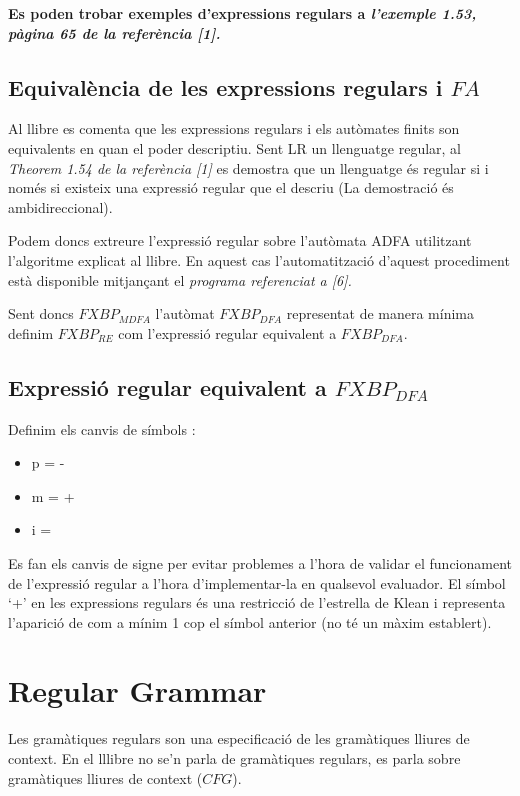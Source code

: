 \documentclass[12pt,a4paper]{report}
\def \dfa{$FXBP_{DFA} $}
\def \mfa{$FXBP_{MDFA} $}
\def \re{$FXBP_{RE} $}
\def \cfg{$CFG$}
\begin{document}
\textbf{Es poden trobar exemples d’expressions regulars a \textit{l’exemple 1.53, pàgina 65 de la referència [1].}}

\subsection{Equivalència de les expressions regulars i $FA$}

Al llibre es comenta que les expressions regulars i els autòmates finits son equivalents en quan el poder descriptiu. Sent LR un llenguatge regular, al \textit{Theorem 1.54 de la referència [1]} es demostra que un llenguatge és regular si i només si existeix una expressió regular que el descriu (La demostració és ambidireccional).

Podem doncs extreure l’expressió regular sobre l’autòmata ADFA utilitzant l’algoritme explicat al llibre. En aquest cas l’automatització d’aquest procediment està disponible mitjançant el \textit{programa referenciat a [6].}

Sent doncs \mfa{} l’autòmat \dfa{} representat de manera mínima definim \re{} com l’expressió regular equivalent a \dfa{}. 

\subsection{Expressió regular equivalent a \dfa{}}

Definim els canvis de símbols : 

\begin{itemize}
\item p = -
\item m = +
\item i = \Return
\end{itemize}

Es fan els canvis de signe per evitar problemes a l’hora de validar el funcionament de l’expressió regular a l’hora d’implementar-la en qualsevol evaluador. El símbol ‘+’ en les expressions regulars és una restricció de l’estrella de Klean i representa l’aparició de com a mínim 1 cop el símbol anterior (no té un màxim establert). 

\section{Regular Grammar}

Les gramàtiques regulars son una especificació de les gramàtiques lliures de context. En el lllibre no se’n parla de gramàtiques regulars, es parla sobre gramàtiques lliures de context (\cfg{}). 
\end{document}
